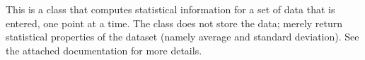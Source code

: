 This is a class that computes statistical information for a set of data that is entered, one point at a time. The class does not store the data; merely return statistical properties of the dataset (namely average and standard deviation). See the attached documentation for more details. 